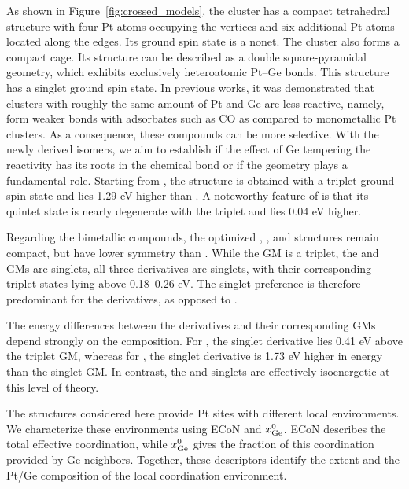 As shown in Figure~\ref{fig:crossed_models}, the  cluster has a compact tetrahedral structure with four Pt atoms occupying the vertices and six additional Pt atoms located along the edges. Its ground spin state is a
nonet. The  cluster also forms a compact cage. Its structure can be described as a double square-pyramidal geometry, which exhibits exclusively heteroatomic Pt–Ge bonds. This structure has a singlet ground spin state.
In previous works\cite{ugartemendia:2021,ugartemendia:2024,poths:2023b}, it was demonstrated that clusters with roughly the same amount of Pt and Ge are less reactive, namely, form weaker bonds with adsorbates such as CO as compared to monometallic Pt clusters. As a consequence, these compounds can be more selective. With the newly derived isomers, we aim to establish if the effect of Ge tempering the reactivity has its roots in the  chemical bond or if the geometry plays a fundamental role. Starting from , the  structure is obtained with a triplet ground spin state and lies 1.29 eV higher than . 
A noteworthy feature of  is that its quintet state is nearly degenerate with the triplet and lies 0.04 eV higher.

Regarding the bimetallic compounds, the optimized , , and  structures remain compact, but have lower symmetry than . While the  GM is a triplet, the  and  GMs are singlets\cite{ugartemendia:2022},  all three  derivatives are singlets, with their corresponding triplet states lying above 0.18--0.26 eV. The singlet preference is therefore predominant for the  derivatives, as opposed to  .

The energy differences between the derivatives and their corresponding GMs depend strongly on the composition. For , the singlet derivative lies 0.41 eV above the triplet GM, whereas for , the singlet derivative is 1.73 eV higher in energy than the singlet GM. In contrast,  the  and  singlets are effectively isoenergetic at this level of theory.

The structures considered here provide Pt sites with different local environments. We characterize these environments using ECoN and $x_{\rm Ge}^{0}$. ECoN describes the total effective coordination, while $x_{\rm Ge}^{0}$ gives the fraction of this coordination provided by Ge neighbors. Together, these descriptors identify the extent and the Pt/Ge composition of the local coordination environment.

